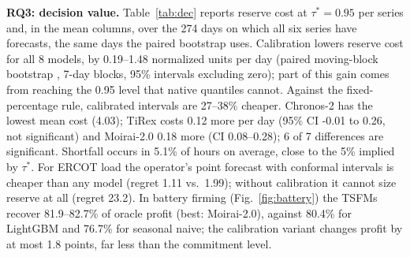 \documentclass[conference]{IEEEtran}
\begin{document}
\textbf{RQ3: decision value.} Table~\ref{tab:dec} reports reserve cost at $\tau^*=0.95$ per series and, in the mean columns, over the 274 days on which all six series have forecasts, the same days the paired bootstrap uses. Calibration lowers reserve cost for all 8 models, by 0.19--1.48 normalized units per day (paired moving-block bootstrap \cite{kunsch1989}, 7-day blocks, 95\% intervals excluding zero); part of this gain comes from reaching the 0.95 level that native quantiles cannot. Against the fixed-percentage rule, calibrated intervals are 27--38\% cheaper. Chronos-2 has the lowest mean cost (4.03); TiRex costs 0.12 more per day (95\% CI -0.01 to 0.26, not significant) and Moirai-2.0 0.18 more (CI 0.08--0.28); 6 of 7 differences are significant. Shortfall occurs in 5.1\% of hours on average, close to the 5\% implied by $\tau^*$. For ERCOT load the operator's point forecast with conformal intervals is cheaper than any model (regret 1.11 vs.\ 1.99); without calibration it cannot size reserve at all (regret 23.2). In battery firming (Fig.~\ref{fig:battery}) the TSFMs recover 81.9--82.7\% of oracle profit (best: Moirai-2.0), against 80.4\% for LightGBM and 76.7\% for seasonal naive; the calibration variant changes profit by at most 1.8 points, far less than the commitment level.
\end{document}
